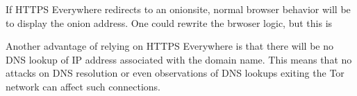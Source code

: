 \documentclass[10pt, conference, compsocconf]{styles/IEEEtran}
\begin{document}
If HTTPS Everywhere redirects to an onionsite, normal browser
behavior will be to display the onion address. One could rewrite
the brwoser logic, but this is 

Another advantage of relying on HTTPS Everywhere is that there will
be no DNS lookup of IP address associated with the domain name.
This means that no attacks on DNS resolution or even observations
of DNS lookups exiting the Tor network can affect such connections.

%
\end{document}
